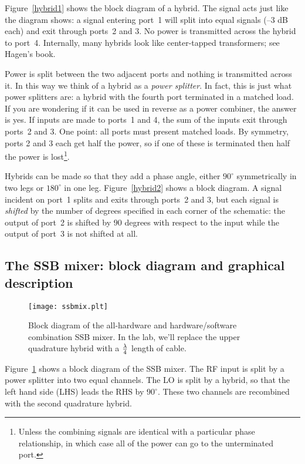 \documentclass[11pt,preprint]{aastex}
\begin{document}
        Figure\ \ref{hybrid1} shows the block diagram of a hybrid.  The
signal acts just like the diagram shows: a signal entering port\ 1 will
split into equal signals (--3 dB each) and exit through ports\ 2 and 3.
No power is transmitted across the hybrid to port\ 4.  Internally, many
hybrids look like center-tapped transformers; see Hagen's book.

        Power is split between the two adjacent ports and nothing is
transmitted across it.  In this way we think of a hybrid as a {\it power
splitter}.  In fact, this is just what power splitters are: a hybrid
with the fourth port terminated in a matched load. If you are wondering
if it can be used in reverse as a power combiner, the answer is yes.  If
inputs are made to ports\ 1 and 4, the sum of the inputs exit through
ports\ 2 and 3. One point: all ports must present matched loads. By
symmetry, ports 2 and 3 each get half the power, so if one of these is
terminated then half the power is lost\footnote{Unless the combining
  signals are identical with a particular phase relationship, in which
  case all of the power can go to the unterminated port.}.

        Hybrids can be made so that they add a phase angle, either
$90^\circ$ symmetrically in two legs or $180^\circ$ in one leg.
Figure\ \ref{hybrid2} shows a block diagram.  A signal incident on port\
1
splits and exits through ports\ 2 and 3, but  each signal is
\emph{shifted} by the number of degrees specified in each corner of the
schematic:  the output of port\ 2 is shifted by $90$ degrees with
respect to the input while the
output of port\ 3 is not shifted at all.


\subsection{The SSB mixer: block diagram and graphical description}

\begin{figure}[ht]
        \begin{center}
        \leavevmode
        \texttt{[image: ssbmix.plt]}
        \end{center}
        \caption{Block diagram of the all-hardware and
                hardware/software combination SSB mixer. In the lab,
                we'll replace the upper quadrature hybrid with a
                $\lambda \over 4$ length of cable.}\label{ssbmfig}
\end{figure}

Figure\ \ref{ssbmfig} shows a block diagram of the SSB mixer.  The RF
input is split by a power splitter into two equal channels. The LO is
split by a hybrid, so that the left hand side (LHS) leads the RHS by
$90^\circ$.  These two channels are recombined with the second
quadrature hybrid.
\end{document}
